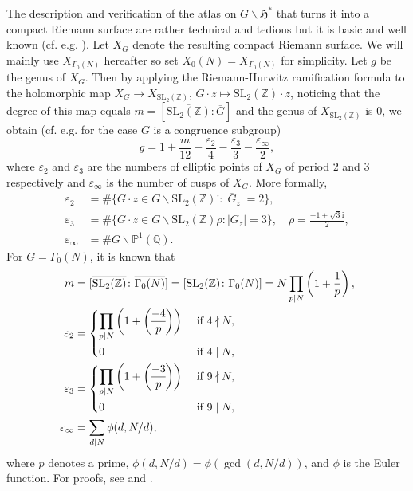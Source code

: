 \documentclass[12pt]{amsart}
\numberwithin{equation}{section}
\theoremstyle{plain}
\theoremstyle{definition}
\theoremstyle{remark}
\newcommand\rmi{\mathrm{i}}
\newcommand\legendre[2]{\genfrac{(}{)}{}{}{#1}{#2}}
\newcommand*\abs[1]{\lvert#1\rvert}
\newcommand\projQ{\mathbb{P}^1(\mathbb{Q})}
\newcommand\slZ{\mathrm{SL}_2(\mathbb{Z})}
\newcommand\uhp{\mathfrak{H}}
\begin{document}
The description and verification of the atlas on $G\backslash\uhp^{*}$ that turns it into a compact Riemann surface are rather technical and tedious but it is basic and well known (cf. e.g. \cite[Section 1.8]{Miy06}). Let $X_G$ denote the resulting compact Riemann surface. We will mainly use $X_{\Gamma_0(N)}$ hereafter so set $X_0(N)=X_{\Gamma_0(N)}$ for simplicity. Let $g$ be the genus of $X_G$. Then by applying the Riemann-Hurwitz ramification formula to the holomorphic map $X_G\rightarrow X_{\slZ}$, $G\cdot z \mapsto \slZ\cdot z$, noticing that the degree of this map equals $m=[\overline{\slZ}\colon\overline{G}]$ and the genus of $X_{\slZ}$ is $0$, we obtain (cf. e.g. \cite[Theorem 3.1.1]{DS05} for the case $G$ is a congruence subgroup)
\begin{equation}
\label{eq:genusGamma0N}
g=1+\frac{m}{12}-\frac{\varepsilon_2}{4}-\frac{\varepsilon_3}{3}-\frac{\varepsilon_\infty}{2},
\end{equation}
where $\varepsilon_2$ and $\varepsilon_3$ are the numbers of elliptic points of $X_G$ of period $2$ and $3$ respectively and $\varepsilon_\infty$ is the number of cusps of $X_G$. More formally,
\begin{align*}
\varepsilon_2&=\#\{G\cdot z\in G\backslash\slZ\rmi\colon\abs{\overline{G}_{z}}=2\},\\
\varepsilon_3&=\#\{G\cdot z\in G\backslash\slZ\rho\colon\abs{\overline{G}_{z}}=3\},\quad\rho=\frac{-1+\sqrt{3}\rmi}{2},\\
\varepsilon_\infty&=\#G\backslash\projQ.
\end{align*}
For $G=\Gamma_0(N)$, it is known that
\begin{align}
m&=[\overline{\slZ}\colon\overline{\Gamma_0(N)}]=[\slZ\colon\Gamma_0(N)]=N\prod_{p\mid N}\left(1+\frac{1}{p}\right),\label{eq:mGamma0N}\\
\varepsilon_2&=\begin{dcases}
\prod_{p \mid N}\left(1+\legendre{-4}{p}\right) & \text{ if } 4\nmid N,\\
0 & \text{ if } 4\mid N,
\end{dcases}\label{eq:e2Gamma0N}\\
\varepsilon_3&=\begin{dcases}
\prod_{p \mid N}\left(1+\legendre{-3}{p}\right) & \text{ if } 9\nmid N,\\
0 & \text{ if } 9\mid N,
\end{dcases}\label{eq:e3Gamma0N}\\
\varepsilon_\infty&=\sum_{d\mid N}\phi(d,N/d),\label{eq:einftyGamma0N}
\end{align}
where $p$ denotes a prime, $\phi(d,N/d)=\phi(\gcd(d,N/d))$, and $\phi$ is the Euler function. For proofs, see \cite[Corollary 6.2.13, Corollary 6.3.24(b)]{CS17} and \cite[Corollary 3.7.2]{DS05}.
\end{document}
